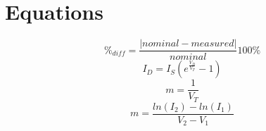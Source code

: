 \documentclass{article}
\begin{document}
\section{Equations}
\label{sec:equations}

\begin{equation}
  \label{eq:percent_diff}
  \%_{diff} = \frac{|nominal - measured|}{nominal}100\%
\end{equation}
%
\begin{equation}
  \label{eq:schockley}
  I_D = I_S \left(e^{\frac{V_D}{V_T}} - 1\right)
\end{equation}
%
\begin{equation}
  \label{eq:m_nom}
  m = \frac{1}{V_T}
\end{equation}
%
\begin{equation}
  \label{eq:m_meas}
  m = \frac{ln(I_2)-ln(I_1)}{V_2-V_1}
\end{equation}
\end{document}
